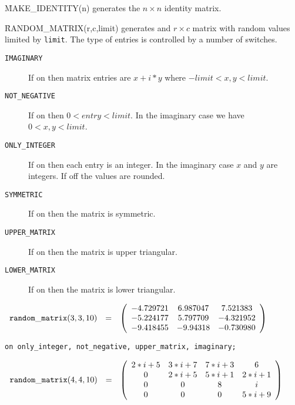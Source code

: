 \f{MAKE\_IDENTITY}(n) generates the $n \times
n$ identity matrix. 

\f{RANDOM\_MATRIX}(r,c,limit) generates and $r
\times c$ matrix with random values limited by {\tt limit}.  The type
of entries is controlled by a number of switches.

\begin{description}
\item[{\tt IMAGINARY}]
If on then matrix entries are $x+i*y$ where $-limit < x,y < limit$.
\item[{\tt NOT\_NEGATIVE}]
If on then $0 < entry < limit$. In the imaginary case we have $0 < x,y
< limit$.
\item[{\tt ONLY\_INTEGER}]
If on then each entry is an integer.  In the imaginary case $x$ and $y$ are
integers.  If off the values are rounded.
\item[{\tt SYMMETRIC}]
If on then the matrix is symmetric.
\item[{\tt UPPER\_MATRIX}]
If on then the matrix is upper triangular.
\item[{\tt LOWER\_MATRIX}]
If on then the matrix is lower triangular.
\end{description}

\begin{flushleft}  
\hspace*{0.1in}
\begin{math}  
\begin{array}{ccc}
{\tt random\_matrix}(3,3,10) & = & 
        \left( \begin{array}{ccc} -4.729721 & 6.987047 & 7.521383 \\
- 5.224177 & 5.797709 & - 4.321952 \\
- 9.418455 & - 9.94318 & - 0.730980
 \end{array} \right) 
\end{array}
\end{math}  
\end{flushleft}

\vspace*{0.2in}
\hspace*{0.165in}
{\tt on only\_integer, not\_negative, upper\_matrix, imaginary;}
\begin{flushleft}  
\begin{math}        
\begin{array}{ccc}
{\tt random\_matrix}(4,4,10) & = & 
\left( \begin{array}{cccc} 2*i+5 & 3*i+7 & 7*i+3 & 6 \\ 0 & 2*i+5 & 
5*i+1 & 2*i+1 \\ 0 & 0 & 8 & i \\ 0 & 0 & 0& 5*i+9 
\end{array} \right)
\end{array}
\end{math}  
\end{flushleft}

